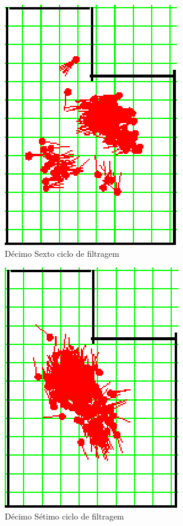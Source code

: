 \begin{figure}[H]
  \centering
  \includegraphics[scale=0.6]{figuras/cen1_ex3/17.eps}
  \caption[Décimo Sexto Ciclo de Filtragem]{Décimo Sexto ciclo de filtragem}
  \label{img:cen1_ex3_17}
\end{figure}

\begin{figure}[H]
  \centering
  \includegraphics[scale=0.6]{figuras/cen1_ex3/18.eps}
  \caption[Décimo Sétimo Ciclo de Filtragem]{Décimo Sétimo ciclo de filtragem}
  \label{img:cen1_ex3_18}
\end{figure}

